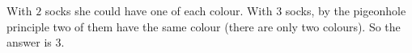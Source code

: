 With $2$ socks she could have one of each colour. With $3$ socks, by the pigeonhole principle two of them have the same colour (there are only two colours). So the answer is $\boxed{3}$.
